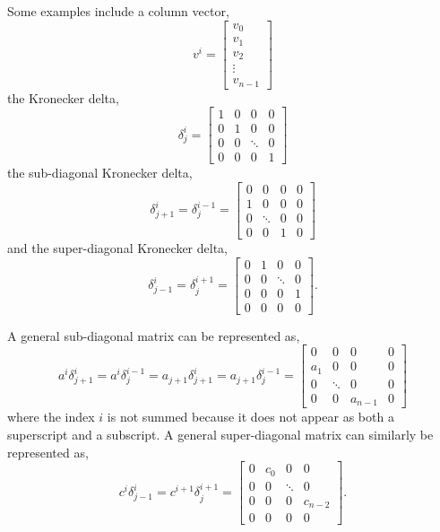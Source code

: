 \documentclass[11pt]{article}
\begin{document}
Some examples include a column vector,
\begin{equation}
v^i = \left[\begin{array}{c}v_0 \\v_1 \\v_2 \\ \vdots \\v_{n-1}\end{array}\right]
\end{equation}
the Kronecker delta,
\begin{equation}
\delta^i_j = \left[\begin{array}{cccc}1 & 0 & 0 & 0 \\0 & 1 & 0 & 0 \\0 & 0 & \ddots & 0 \\0 & 0 & 0 & 1\end{array}\right]
\end{equation}
the sub-diagonal Kronecker delta,
\begin{equation}
\delta^i_{j+1} = \delta^{i-1}_j = \left[\begin{array}{cccc}0 & 0 & 0 & 0 \\1 & 0 & 0 & 0 \\0 & \ddots & 0 & 0 \\0 & 0 & 1 & 0\end{array}\right]
\end{equation}
and the super-diagonal Kronecker delta,
\begin{equation}
\delta^i_{j-1} = \delta^{i+1}_j = \left[\begin{array}{cccc}0 & 1 & 0 & 0 \\0 & 0 & \ddots & 0 \\0 & 0 & 0 & 1 \\0 & 0 & 0 & 0\end{array}\right].
\end{equation}

A general sub-diagonal matrix can be represented as,
\begin{equation}
a^i \delta^i_{j+1} = a^{i} \delta^{i-1}_j = a_{j+1} \delta^i_{j+1} = a_{j+1} \delta^{i-1}_j = \left[\begin{array}{cccc}0 & 0 & 0 & 0 \\a_1 & 0 & 0 & 0 \\0 & \ddots & 0 & 0 \\0 & 0 & a_{n-1} & 0\end{array}\right]
\end{equation}
where the index $i$ is not summed because it does not appear as both a superscript and a subscript. A general super-diagonal matrix can similarly be represented as,
\begin{equation}
c^i \delta^i_{j-1} =c^{i+1} \delta^{i+1}_j = \left[\begin{array}{cccc}0 & c_0 & 0 & 0 \\0 & 0 & \ddots & 0 \\0 & 0 & 0 & c_{n-2} \\0 & 0 & 0 & 0\end{array}\right].
\end{equation}
\end{document}
